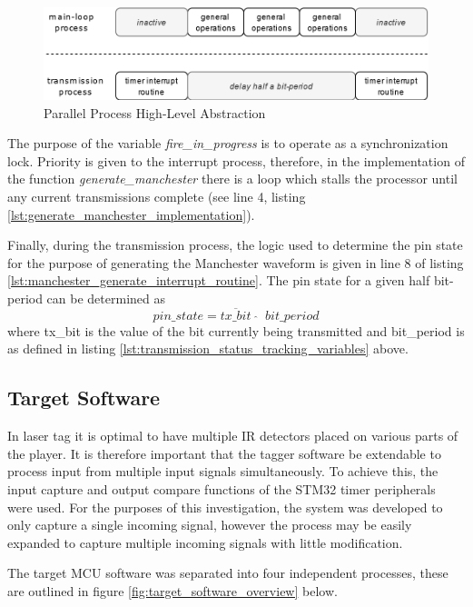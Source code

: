 \begin{figure}[H]
	\centering
	\includegraphics[width=0.8\linewidth]{figures/design/parallel_process_transmission.png}
	\caption{Parallel Process High-Level Abstraction}
	\label{fig:parallel_process_abstraction}
\end{figure}

The purpose of the variable \textit{fire\_in\_progress} is to operate as a synchronization lock. Priority is given to the interrupt process, therefore, in the implementation of the function \textit{generate\_manchester} there is a loop which stalls the processor until any current transmissions complete (see line 4, listing \ref{lst:generate_manchester_implementation}).

Finally, during the transmission process, the logic used to determine the pin state for the purpose of generating the Manchester waveform is given in line 8 of listing \ref{lst:manchester_generate_interrupt_routine}. The pin state for a given half bit-period can be determined as \[pin\_state = \overline{tx\_bit} \;\; \widehat{} \;\; bit\_period\] where tx\_bit is the value of the bit currently being transmitted and bit\_period is as defined in listing \ref{lst:transmission_status_tracking_variables} above.


\subsection{Target Software}

In laser tag it is optimal to have multiple IR detectors placed on various parts of the player. It is therefore important that the tagger software be extendable to process input from multiple input signals simultaneously. To achieve this, the input capture and output compare functions of the STM32 timer peripherals were used. For the purposes of this investigation, the system was developed to only capture a single incoming signal, however the process may be easily expanded to capture multiple incoming signals with little modification.

The target MCU software was separated into four independent processes, these are outlined in figure \ref{fig:target_software_overview} below.

